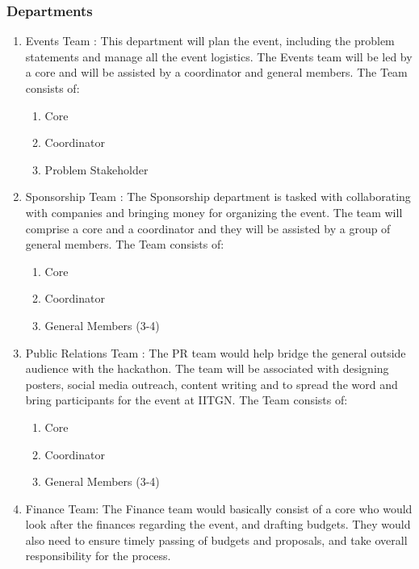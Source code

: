 \documentclass[12pt]{article}
\begin{document}
\subsubsection{Departments}
\begin{enumerate}
    \item Events Team : This department will plan the event, including the problem statements and manage all the event logistics. The Events team will be led by a core and will be assisted by a coordinator and general members. The Team consists of:
    \begin{enumerate}
        \item Core
        \item Coordinator
        \item Problem Stakeholder
    \end{enumerate}
    \item Sponsorship Team : The Sponsorship department is tasked with collaborating with companies and bringing money for organizing the event. The team will comprise a core and a coordinator and they will be assisted by a group of general members. The Team consists of:
    \begin{enumerate}
        \item Core
        \item Coordinator
        \item General Members (3-4)
    \end{enumerate}
    \item Public Relations Team : The PR team would help bridge the general outside audience with the hackathon. The team will be associated with designing posters, social media outreach, content writing and to spread the word and bring participants for the event at IITGN. The Team consists of:
    \begin{enumerate}
        \item Core
        \item Coordinator
        \item General Members (3-4)
    \end{enumerate}
    \item Finance Team: The Finance team would basically consist of a core who would look after the finances regarding the event, and drafting budgets. They would also need to ensure timely passing of budgets and proposals, and take overall responsibility for the process.
\end{enumerate}
\end{document}
